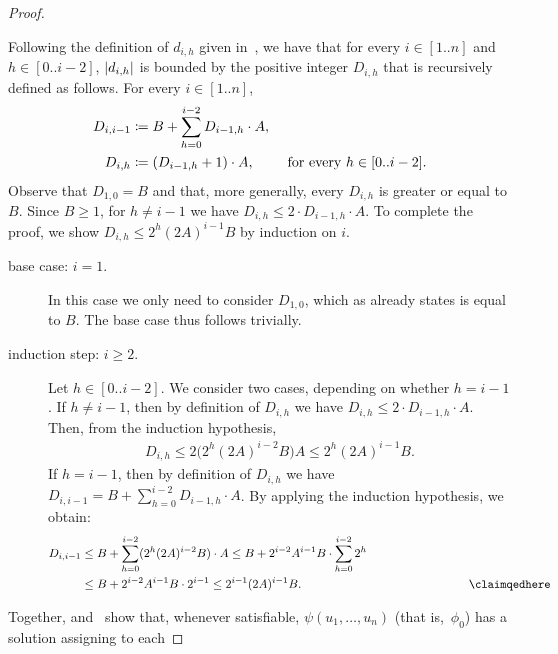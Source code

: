 \begin{proof}
\begin{claimproof}
    Following the definition of $d_{i,h}$ given in~, we have
    that for every $i \in [1..n]$ and $h \in [0..i-2]$, $\left|d_{i,h}\right|$ is
    bounded by the positive integer $D_{i,h}$ that is recursively defined as
    follows. For every $i \in [1..n]$,
    \begin{align*}
      D_{i,i-1} &\coloneqq B + \sum_{h=0}^{i-2} D_{i-1,h} \cdot A, \notag\\
      D_{i,h} &\coloneqq (D_{i-1,h} + 1) \cdot A,
      &\text{ for every } h \in [0..i-2].
    \end{align*}
    Observe that $D_{1,0} = B$ and that, more generally, every $D_{i,h}$ is greater or equal to $B$.
    Since $B \geq 1$, for $h \neq i-1$ we have $D_{i,h} \leq 2 \cdot D_{i-1,h} \cdot A$. 
    To complete the proof, we show $D_{i,h} \leq 2^{h} (2A)^{i-1}B$ 
    by induction on $i$. 
    \begin{description}
      \item[base case: $i = 1$.] In this case we only need to consider $D_{1,0}$, which as already states is equal to $B$. The base case thus follows trivially.
      \item[induction step: $i \geq 2$.] Let $h \in [0..i-2]$. We consider two cases, depending on whether $h = i-1$. If $h \neq i-1$, then by definition of $D_{i,h}$ we have $D_{i,h} \leq 2 \cdot D_{i-1,h} \cdot A$. Then, from the induction hypothesis, 
        \begin{align*} 
          D_{i,h} \leq 2 \big( 2^{h} (2A)^{i-2} B\big)A 
          \leq 2^{h} (2A)^{i-1} B.
        \end{align*}
        If $h = i-1$, then by definition of $D_{i,h}$ we have  $D_{i,i-1} = B + \sum_{h=0}^{i-2} D_{i-1,h} \cdot A$. By applying the induction hypothesis, we obtain:
        \begin{align*} 
          D_{i,i-1} 
          &\leq B + \sum_{h=0}^{i-2} (2^{h} (2A)^{i-2} B) \cdot A \leq B + 2^{i-2}A^{i-1}B \cdot \sum_{h=0}^{i-2} 2^{h}\\ 
          &\leq B + 2^{i-2}A^{i-1}B \cdot 2^{i-1} 
          \leq 2^{i-1} (2A)^{i-1}B.  
          &\hspace{2.64cm}\text{\claimqedhere}
        \end{align*}
    \end{description}
  \end{claimproof}
  Together, 
  and~ show that, whenever satisfiable,
  $\psi(u_1,\dots,u_n)$ (that is,~$\phi_0$) has a solution assigning to each

\end{proof}

